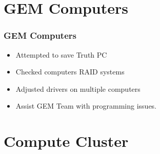 \documentclass[aspectratio=169]{beamer}
\begin{document}


\section{GEM Computers}

\begin{frame}

  \frametitle{GEM Computers}

  \begin{itemize}
    \item Attempted to save Truth PC
    \item Checked computers RAID systems
    \item Adjusted drivers on multiple computers
    \item Assist GEM Team with programming issues. 
  \end{itemize}

\end{frame}



\section{Compute Cluster}
\end{document}
